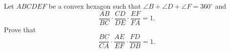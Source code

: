 Let $ABCDEF$ be a convex hexagon such that $\angle B+\angle D+\angle F=360^{\circ }$ and \[ \frac{AB}{BC} \cdot \frac{CD}{DE} \cdot \frac{EF}{FA} = 1.  \] Prove that \[ \frac{BC}{CA} \cdot \frac{AE}{EF} \cdot \frac{FD}{DB} = 1.  \]